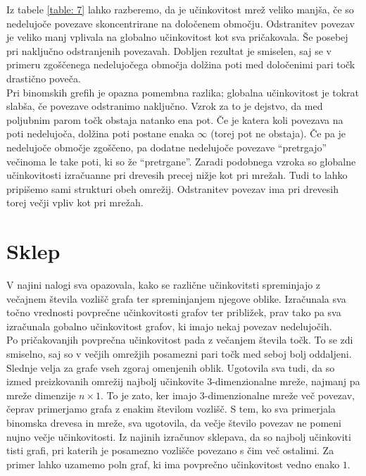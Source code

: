 \documentclass[a4paper, 16pt]{article}
\begin{document}
Iz tabele \ref{table: 7} lahko razberemo, da je učinkovitost mrež veliko manjša, če so nedelujoče povezave skoncentrirane na določenem območju. Odstranitev povezav je veliko manj vplivala na globalno učinkovitost kot sva pričakovala.
Še posebej pri naključno odstranjenih povezavah. Dobljen rezultat je smiselen, saj se v primeru zgoščenega nedelujočega območja dolžina poti med določenimi pari točk drastično poveča. \\
Pri binomskih grefih je opazna pomembna razlika; globalna učinkovitost je tokrat slabša, če povezave odstranimo naključno. Vzrok za to je dejstvo, da med poljubnim parom točk obstaja natanko ena pot.
Če je katera koli povezava na poti nedelujoča, dolžina poti postane enaka $\infty$ (torej pot ne obstaja). Če pa je nedelujoče območje zgoščeno, pa dodatne nedelujoče povezave ``pretrgajo'' večinoma le take poti, ki so že ``pretrgane''. 
Zaradi podobnega vzroka so globalne učinkovitosti izračuanne pri drevesih precej nižje kot pri mrežah. Tudi to lahko pripišemo sami strukturi obeh omrežij. Odstranitev povezav ima pri drevesih torej večji vpliv
kot pri mrežah.

\newpage

\section{Sklep}
V najini nalogi sva opazovala, kako se različne učinkovitsti spreminjajo z večajnem števila vozlišč grafa ter spreminjanjem njegove oblike. Izračunala sva točno vrednosti povprečne učinkovitosti grafov ter približek,
prav tako pa sva izračunala gobalno učinkovitost grafov, ki imajo nekaj povezav nedelujočih.\\


Po pričakovanjih povprečna učinkovitost pada z večanjem števila točk.
To se zdi smiselno, saj so v večjih omrežjih posamezni pari točk med seboj bolj oddaljeni.
Slednje velja za grafe vseh zgoraj omenjenih oblik. 
Ugotovila sva tudi, da so izmed preizkovanih omrežij najbolj učinkovite 3-dimenzionalne mreže, 
najmanj pa mreže dimenzije $n \times 1$. To je zato, ker imajo 3-dimenzionalne mreže več povezav, čeprav primerjamo grafa z enakim številom vozlišč.
S tem, ko sva primerjala binomska drevesa in mreže, sva ugotovila, da večje število povezav ne pomeni nujno večje učinkovitosti. 
Iz najinih izračunov sklepava, da so najbolj učinkoviti tisti grafi, pri katerih je posamezno vozlišče povezano s čim več ostalimi. 
Za primer lahko uzamemo poln graf, ki ima povprečno učinkovitost vedno enako $1$.\\
\end{document}
